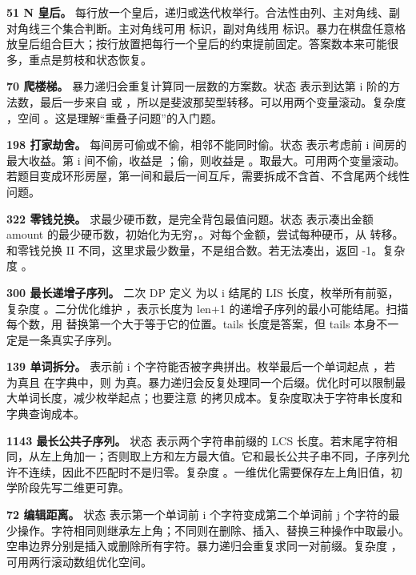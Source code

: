 \textbf{51 N 皇后。} 每行放一个皇后，递归或迭代枚举行。合法性由列、主对角线、副对角线三个集合判断。主对角线可用  标识，副对角线用  标识。暴力在棋盘任意格放皇后组合巨大；按行放置把每行一个皇后的约束提前固定。答案数本来可能很多，重点是剪枝和状态恢复。

\textbf{70 爬楼梯。} 暴力递归会重复计算同一层数的方案数。状态  表示到达第 i 阶的方法数，最后一步来自  或 ，所以是斐波那契型转移。可以用两个变量滚动。复杂度 ，空间 。这是理解“重叠子问题”的入门题。

\textbf{198 打家劫舍。} 每间房可偷或不偷，相邻不能同时偷。状态  表示考虑前 i 间房的最大收益。第 i 间不偷，收益是 ；偷，则收益是 。取最大。可用两个变量滚动。若题目变成环形房屋，第一间和最后一间互斥，需要拆成不含首、不含尾两个线性问题。

\textbf{322 零钱兑换。} 求最少硬币数，是完全背包最值问题。状态  表示凑出金额 amount 的最少硬币数，初始化为无穷，。对每个金额，尝试每种硬币，从  转移。和零钱兑换 II 不同，这里求最少数量，不是组合数。若无法凑出，返回 -1。复杂度 。

\textbf{300 最长递增子序列。} 二次 DP 定义  为以 i 结尾的 LIS 长度，枚举所有前驱，复杂度 。二分优化维护 ，表示长度为 len+1 的递增子序列的最小可能结尾。扫描每个数，用  替换第一个大于等于它的位置。tails 长度是答案，但 tails 本身不一定是一条真实子序列。

\textbf{139 单词拆分。}  表示前 i 个字符能否被字典拼出。枚举最后一个单词起点 ，若  为真且 \code{s[j..i)} 在字典中，则  为真。暴力递归会反复处理同一个后缀。优化时可以限制最大单词长度，减少枚举起点；也要注意  的拷贝成本。复杂度取决于字符串长度和字典查询成本。

\textbf{1143 最长公共子序列。} 状态  表示两个字符串前缀的 LCS 长度。若末尾字符相同，从左上角加一；否则取上方和左方最大值。它和最长公共子串不同，子序列允许不连续，因此不匹配时不是归零。复杂度 。一维优化需要保存左上角旧值，初学阶段先写二维更可靠。

\textbf{72 编辑距离。} 状态  表示第一个单词前 i 个字符变成第二个单词前 j 个字符的最少操作。字符相同则继承左上角；不同则在删除、插入、替换三种操作中取最小。空串边界分别是插入或删除所有字符。暴力递归会重复求同一对前缀。复杂度 ，可用两行滚动数组优化空间。

